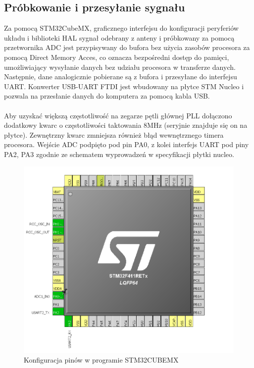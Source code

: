 \documentclass[12pt]{article}
\begin{document}
\subsection{Próbkowanie i przesyłanie sygnału}
Za pomocą STM32CubeMX, graficznego interfejsu do konfiguracji peryferiów układu i biblioteki HAL sygnał odebrany z anteny i próbkowany za pomocą przetwornika ADC jest przypisywany do bufora bez użycia zasobów procesora za pomocą Direct Memory Acces, co oznacza bezpośredni dostęp do pamięci, umożliwiający wysyłanie danych bez udziału procesora w transferze danych. Następnie, dane analogicznie pobierane są z bufora i przesyłane do interfejsu UART. Konwerter USB-UART FTDI jest wbudowany na płytce STM Nucleo i pozwala na przesłanie danych do komputera za pomocą kabla USB.\\
\\Aby uzyskać większą częstotliwość na zegarze pętli głównej PLL dołączono dodatkowy kwarc o częstotliwości taktowania 8MHz (seryjnie znajduje się on na płytce). Zewnętrzny kwarc zmniejsza również błąd wewnętrznego timera procesora. Wejście ADC podpięto pod pin PA0, z kolei interfejs UART pod piny PA2, PA3 zgodnie ze schematem wyprowadzeń w specyfikacji płytki nucleo. 

\begin{figure}[H]
\begin{center}
\includegraphics[width=1\textwidth]{figures/cube.png}
\caption{Konfiguracja pinów w programie STM32CUBEMX}
\end{center}
\end{figure}
\end{document}
